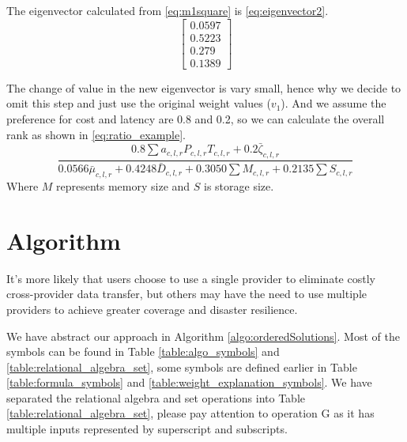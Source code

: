 The eigenvector calculated from \eqref{eq:m1square} is \eqref{eq:eigenvector2}.
\begin{equation}
\label{eq:eigenvector2}
\left[ 
\begin{array}{c} 
0.0597 \\ 
0.5223 \\
0.279 \\
0.1389
\end{array} 
\right] 
\end{equation}

The change of value in the new eigenvector is vary small, hence why we decide to omit this step and just use the original weight values ($v_1$). And we assume the preference for cost and latency are 0.8 and 0.2, so we can calculate the overall rank as shown in \eqref{eq:ratio_example}.
\begin{equation}\label{eq:ratio_example}
\frac{0.8 \sum { a_{c,l,r} P_{c,l,r} T_{c,l,r} } + 0.2 \bar\zeta_{c,l,r} }{0.0566 \bar\mu_{c,l,r} + 0.4248\bar D_{c,l,r} + 0.3050 \sum M_{c,l,r} + 0.2135 \sum S_{c,l,r}}
\end{equation}
Where $M$ represents memory size and $S$ is storage size.

\section{Algorithm}
It's more likely that users choose to use a single provider to eliminate costly cross-provider data transfer, but others may have the need to use multiple providers to achieve greater coverage and disaster resilience.

We have abstract our approach in Algorithm \ref{algo:orderedSolutions}. Most of the symbols can be found in Table \ref{table:algo_symbols} and \ref{table:relational_algebra_set}, some symbols are defined earlier in Table \ref{table:formula_symbols} and \ref{table:weight_explanation_symbols}. We have separated the relational algebra and set operations into Table \ref{table:relational_algebra_set}, please pay attention to operation G as it has multiple inputs represented by superscript and subscripts.

